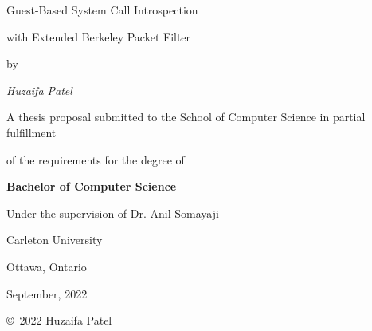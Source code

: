 \documentclass{article}
\begin{document}
\thispagestyle{empty}

\centerline{\Huge Guest-Based System Call Introspection}
\vspace{3mm}
\centerline{\Huge with Extended Berkeley Packet Filter}
\vspace{14mm}
\centerline{\large by}
\vspace{15mm}
\centerline{\itshape \large Huzaifa Patel}
\vspace{2cm}
\centerline{\large A thesis proposal submitted to the School of Computer Science in partial fulfillment}
\vspace{2mm}
\centerline{\large of the requirements for the degree of}
\vspace{2cm}
\centerline{\bf \large Bachelor of Computer Science}
\vspace{3cm}
\centerline{\large Under the supervision of Dr. Anil Somayaji}
\vspace{3mm}
\centerline{\large Carleton University}
\vspace{3mm}
\centerline{\large Ottawa, Ontario}
\vspace{3mm}
\centerline{\large September, 2022}
\vspace{3cm}
\centerline{\large \copyright \, 2022 Huzaifa Patel}



\begin{flushleft}
\vspace{3cm}
\begin{spacing}{1.5}


\end{spacing}
\end{flushleft}
\end{document}
